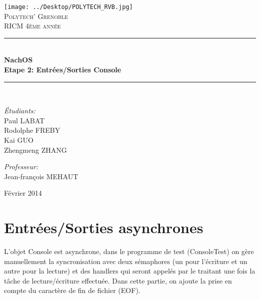 \documentclass[a4paper,10pt]{article}
\newcommand{\HRule}{\rule{\linewidth}{0.5mm}}
\begin{document}
\begin{titlepage}

\begin{center}


\texttt{[image: ../Desktop/POLYTECH\_RVB.jpg]}\\[1cm]

\textsc{\LARGE Polytech' Grenoble}\\[1.5cm]

\textsc{\Large RICM 4ème année}\\[1.2cm]


\HRule \\[0.4cm]
{ \huge \bfseries NachOS\\[0.6cm]
Etape 2: Entrées/Sorties Console}
\\[0.4cm]

\HRule \\[2cm]

\begin{minipage}{0.4\textwidth}
\begin{flushleft} \large
\emph{\'Etudiants:}\\
Paul \textsc{LABAT} \\
Rodolphe \textsc{FREBY} \\
Kai \textsc{GUO} \\
Zhengmeng \textsc{ZHANG}
\end{flushleft}
\end{minipage}
\begin{minipage}{0.4\textwidth}
\begin{flushright} \large
\emph{Professeur:} \\
Jean-françois \textsc{MEHAUT}
\end{flushright}
\end{minipage}

\vfill

{\large  Février 2014}

\end{center}

\end{titlepage}

\section{Entrées/Sorties asynchrones}

L'objet Console est asynchrone, dans le programme de test (ConsoleTest) on
gère manuellement la syncronisation avec deux sémaphores (un pour l'écriture et
un autre pour la lecture) et des handlers qui seront appelés par le traitant
une fois la tâche de lecture/écriture effectuée. Dans cette partie, on ajoute la
prise en compte du caractère de fin de fichier (EOF).
\end{document}
